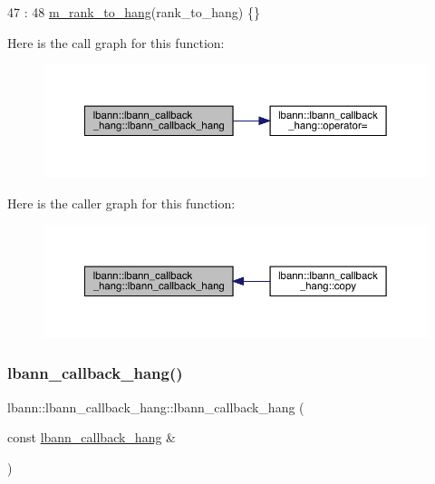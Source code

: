 \begin{DoxyCode}
47                                              :
48     \hyperlink{classlbann_1_1lbann__callback__hang_a6dbd84f40c31b3b1ec3247c8da08a954}{m\_rank\_to\_hang}(rank\_to\_hang) \{\}
\end{DoxyCode}
Here is the call graph for this function\+:\nopagebreak
\begin{figure}[H]
\begin{center}
\leavevmode
\includegraphics[width=350pt]{classlbann_1_1lbann__callback__hang_af5e29a2d416e3268a495df8370b272b6_cgraph}
\end{center}
\end{figure}
Here is the caller graph for this function\+:\nopagebreak
\begin{figure}[H]
\begin{center}
\leavevmode
\includegraphics[width=350pt]{classlbann_1_1lbann__callback__hang_af5e29a2d416e3268a495df8370b272b6_icgraph}
\end{center}
\end{figure}
\mbox{\label{classlbann_1_1lbann__callback__hang_a0633c81998abdfea74a2bdcc38245217}} 
\subsubsection{\texorpdfstring{lbann\+\_\+callback\+\_\+hang()}{lbann\_callback\_hang()}\hspace{0.1cm}{\footnotesize\ttfamily [2/2]}}
{\footnotesize\ttfamily lbann\+::lbann\+\_\+callback\+\_\+hang\+::lbann\+\_\+callback\+\_\+hang (\begin{DoxyParamCaption}\item[{const \hyperlink{classlbann_1_1lbann__callback__hang}{lbann\+\_\+callback\+\_\+hang} \&}]{ }\end{DoxyParamCaption})\hspace{0.3cm}{\ttfamily [default]}}



